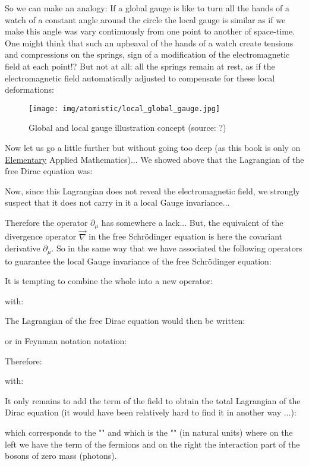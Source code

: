 	So we can make an analogy: If a global gauge is like to turn all the hands of a watch of a constant angle around the circle the local gauge is similar as if we make this angle was vary continuously from one point to another of space-time. One might think that such an upheaval of the hands of a watch create tensions and compressions on the springs, sign of a modification of the electromagnetic field at each point!? But not at all: all the springs remain at rest, as if the electromagnetic field automatically adjusted to compensate for these local deformations:
	\begin{figure}[H]
		\centering
		\texttt{[image: img/atomistic/local\_global\_gauge.jpg]}
		\caption[Global and local gauge illustration concept]{Global and local gauge illustration concept (source: ?)}
	\end{figure}

	Now let us go a little further but without going too deep (as this book is only on \underline{Elementary} Applied Mathematics)... We showed above that the Lagrangian of the free Dirac equation was:
	
	Now, since this Lagrangian does not reveal the electromagnetic field, we strongly suspect that it does not carry in it a local Gauge invariance...
	
	Therefore the operator $\partial_\mu$ has somewhere a lack... But, the equivalent of the divergence operator $\vec{\nabla}$ in the free Schrödinger equation is here the covariant derivative $\partial_\mu$. So in the same way that we have associated the following operators to guarantee the local Gauge invariance of the free Schrödinger equation:
	
	It is tempting to combine the whole into a new operator:
	
	with:
	
	The Lagrangian of the free Dirac equation would then be written:
	
	or in Feynman notation notation:
	
	Therefore:
	
	with:
	
	It only remains to add the term of the field to obtain the total Lagrangian of the Dirac equation (it would have been relatively hard to find it in another way ...):
	
	which corresponds to the "" and which is the "\label{quantum electrodynamics}" (in natural units) where on the left we have the term of the fermions and on the right the interaction part of the bosons of zero mass (photons).

